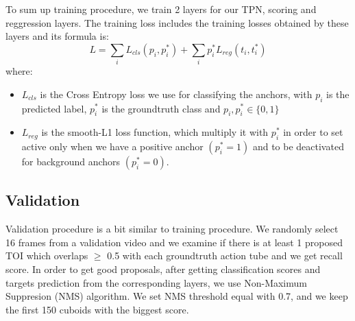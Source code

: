 To sum up training procedure, we train 2 layers for our TPN, scoring and reggression layers. The training loss includes the training losses
obtained by these layers and its formula is:
\[ L  =  \sum_iL_{cls}(p_i, p_i^*) + \sum_ip_i^*L_{reg}(t_i,t_i^*) \]
where:
\begin{itemize}
\item $L_{cls} $ is the Cross Entropy loss we use for classifying the anchors, with $p_i$ is the predicted label, $p_i^*$ is the groundtruth class and
  $p_i, p_i^* \in \{0,1\}$
\item $L_{reg} $ is the smooth-L1 loss function, which multiply it with $p_i^*$ in order to set active only when we have a positive anchor $(p_i^* = 1)$
  and to be deactivated for background anchors $(p_i^* = 0)$.
\end{itemize}

\subsection{Validation}

Validation procedure is a bit similar to training procedure.
We randomly select 16 frames from a validation video and we examine if there is at least 1 proposed TOI
which overlaps $\ge$ 0.5 with each groundtruth action tube and we get recall score. 
In order to get good proposals, after getting classification scores and targets prediction from the
corresponding layers, we use Non-Maximum Suppresion (NMS) algorithm.  We set NMS threshold equal with 0.7,
and we keep the first 150 cuboids with the biggest score.


